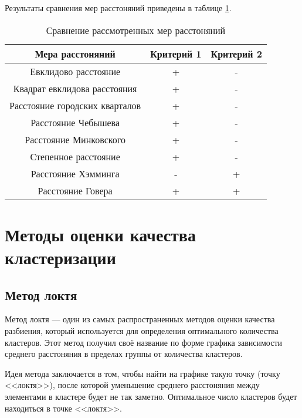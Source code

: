 Результаты сравнения мер расстоняний приведены в таблице \ref{tbl:compare_distance}.
\begin{table}[H]
    \centering
	\caption{Сравнение рассмотренных мер расстоняний}
    \label{tbl:compare_distance}
	\begin{tabular}{|c|c|c|}
        \hline
        \textbf{Мера расстоняний} & \textbf{Критерий 1} & \textbf{Критерий 2}
        \\ \hline

        Евклидово расстояние & + & - \\ \hline
        Квадрат евклидова расстояния & + & - \\ \hline
        Расстояние городских кварталов & + & - \\ \hline
        Расстояние Чебышева & + & - \\ \hline
        Расстояние Минковского & + & - \\ \hline
        Степенное расстояние & + & - \\ \hline
        Расстояние Хэмминга & - & + \\ \hline
        Расстояние Говера & + & + \\ \hline
    
    \end{tabular}
\end{table}


\section{Методы оценки качества кластеризации}


\subsection{Метод локтя}

Метод локтя \cite{ElbowMethod} --- один из самых распространенных методов оценки качества разбиения, который используется для определения оптимального количества кластеров. Этот метод получил своё название по форме графика зависимости среднего расстоняния в пределах группы от количества кластеров.

Идея метода заключается в том, чтобы найти на графике такую точку (точку <<локтя>>), после которой уменьшение среднего расстоняния между элементами в кластере будет не так заметно. Оптимальное число кластеров будет находиться в точке <<локтя>>. 

